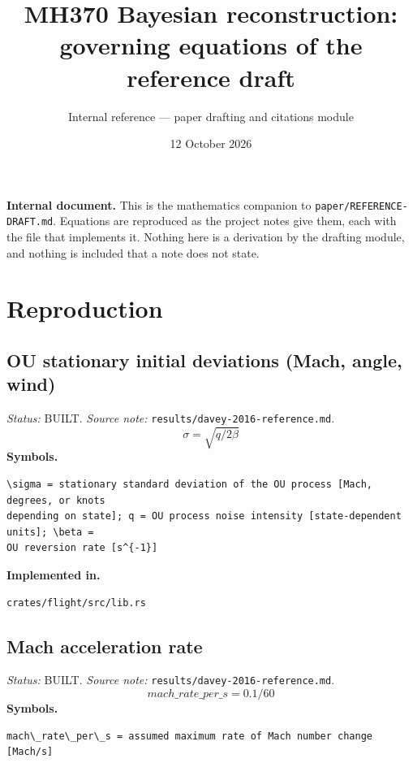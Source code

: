 \documentclass[11pt,a4paper]{article}
\title{MH370 Bayesian reconstruction:\\ governing equations of the reference draft}
\author{Internal reference --- paper drafting and citations module}
\date{12 October 2026}
\begin{document}
\maketitle
\noindent\textbf{Internal document.} This is the mathematics companion to
\texttt{paper/REFERENCE-DRAFT.md}. Equations are reproduced as the project notes give
them, each with the file that implements it. Nothing here is a derivation by the
drafting module, and nothing is included that a note does not state.
\medskip
\section{Reproduction}
\subsection{OU stationary initial deviations (Mach, angle, wind)}
\noindent\textit{Status:} BUILT. \textit{Source note:} \texttt{results/davey-2016-reference.md}.
\medskip
\begin{equation}
\sigma = \sqrt{q / 2\beta}
\end{equation}
\noindent\textbf{Symbols.}
\begin{verbatim}
\sigma = stationary standard deviation of the OU process [Mach, degrees, or knots
depending on state]; q = OU process noise intensity [state-dependent units]; \beta =
OU reversion rate [s^{-1}]
\end{verbatim}
\noindent\textbf{Implemented in.}
\begin{verbatim}
crates/flight/src/lib.rs
\end{verbatim}
\medskip
\subsection{Mach acceleration rate}
\noindent\textit{Status:} BUILT. \textit{Source note:} \texttt{results/davey-2016-reference.md}.
\medskip
\begin{equation}
mach\_rate\_per\_s = 0.1/60
\end{equation}
\noindent\textbf{Symbols.}
\begin{verbatim}
mach\_rate\_per\_s = assumed maximum rate of Mach number change [Mach/s]
\end{verbatim}
\medskip
\end{document}
